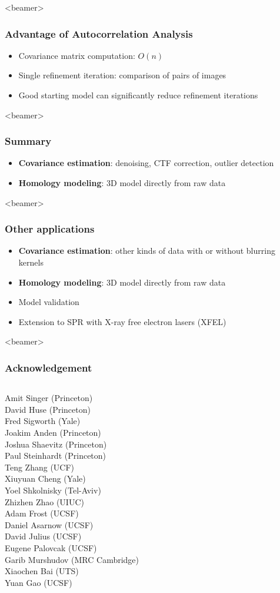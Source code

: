 \documentclass{beamer}
\begin{document}
\begin{frame}<beamer>
\frametitle{Advantage of Autocorrelation Analysis}
\begin{itemize}
\item Covariance matrix computation: $O(n)$
\item Single refinement iteration: comparison of pairs of images
\item Good starting model can significantly reduce refinement iterations
\end{itemize}
\end{frame}

\begin{frame}<beamer>
\frametitle{Summary}
\begin{itemize}
\item \textbf{Covariance estimation}: denoising, CTF correction, outlier detection
\item \textbf{Homology modeling}: 3D model directly from raw data
\end{itemize}
\end{frame}


\begin{frame}<beamer>
\frametitle{Other applications}
\begin{itemize}
\item \textbf{Covariance estimation}: other kinds of data with or without blurring kernels
\item \textbf{Homology modeling}: 3D model directly from raw data
\item Model validation
\item Extension to SPR with X-ray free electron lasers (XFEL)
\end{itemize}
\end{frame}

\begin{frame}<beamer>
\frametitle{Acknowledgement}
\begin{columns}
Amit Singer (Princeton)\\
David Huse (Princeton)\\
Fred Sigworth (Yale)\\
Joakim Anden (Princeton)\\
Joshua Shaevitz (Princeton)\\
Paul Steinhardt (Princeton)\\
Teng Zhang (UCF)\\
Xiuyuan Cheng (Yale)\\
Yoel Shkolnisky (Tel-Aviv) \\
Zhizhen Zhao (UIUC)\\

Adam Frost (UCSF)\\
Daniel Asarnow (UCSF)\\
David Julius (UCSF)\\
Eugene Palovcak (UCSF)\\
Garib Murshudov (MRC Cambridge)\\
Xiaochen Bai (UTS)\\
Yuan Gao (UCSF)\\

\end{columns}
\end{frame}
\end{document}
